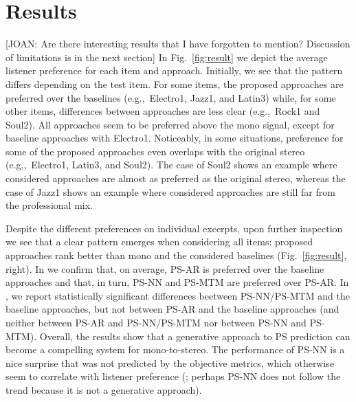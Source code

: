 \documentclass{article}
\newcommand{\joan}[1]{{\color{blue}[JOAN: #1]}}
\newcommand{\joan}[1]{}
\begin{document}
\section{Results}
\label{sec:result}

\joan{Are there interesting results that I have forgotten to mention? Discussion of limitations is in the next section} In Fig.~\ref{fig:result} we depict the average listener preference for each item and approach. Initially, we see that the pattern differs depending on the test item. For some items, the proposed approaches are preferred over the baselines (e.g.,~Electro1, Jazz1, and Latin3) while, for some other items, differences between approaches are less clear (e.g.,~Rock1 and Soul2). All approaches seem to be preferred above the mono signal, except for baseline approaches with Electro1. Noticeably, in some situations, preference for some of the proposed approaches even overlaps with the original stereo (e.g.,~Electro1, Latin3, and Soul2). The case of Soul2 shows an example where considered approaches are almost as preferred as the original stereo, whereas the case of Jazz1 shows an example where considered approaches are still far from the professional mix. 

Despite the different preferences on individual excerpts, upon further inspection we see that a clear pattern emerges when considering all items: proposed approaches rank better than mono and the considered baselines (Fig.~\ref{fig:result}, right). In  we confirm that, on average, PS-AR is preferred over the baseline approaches and that, in turn, PS-NN and PS-MTM are preferred over PS-AR. In , we report statistically significant differences beetween PS-NN/PS-MTM and the baseline approaches, but not between PS-AR and the baseline approaches (and neither between PS-AR and PS-NN/PS-MTM nor between PS-NN and PS-MTM). Overall, the results show that a generative approach to PS prediction can become a compelling system for mono-to-stereo. The performance of PS-NN is a nice surprise that was not predicted by the objective metrics, which otherwise seem to correlate with listener preference (; perhaps PS-NN does not follow the trend because it is not a generative approach). 
\end{document}
